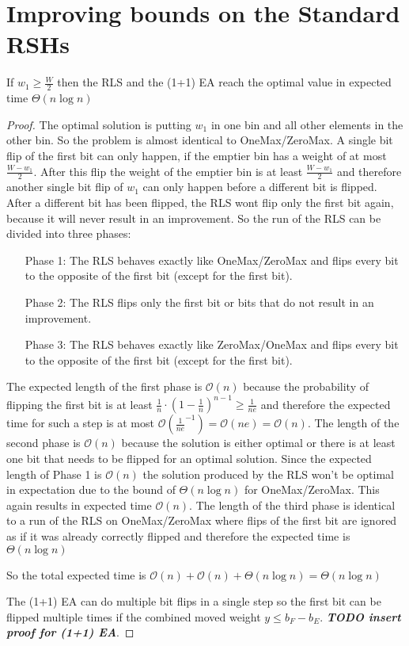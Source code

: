 \section{Improving bounds on the Standard RSHs}
\begin{lemma}\label{OneMaxResult}
    If $w_1 \ge \frac W 2$  then the RLS and the (1+1) EA reach the optimal value in expected time $\Theta(n\log{}n)$
\end{lemma}
\begin{proof}
    The optimal solution is putting $w_1$ in one bin and all other elements in the other bin. So the problem is almost identical to OneMax/ZeroMax. A single bit flip of the first bit can only happen, if the emptier bin has a weight of at most $\frac {W-w_1}{2}$. After this flip the weight of the emptier bin is at least $\frac {W-w_1}{2}$ and therefore another single bit flip of $w_1$ can only happen before a different bit is flipped. After a different bit has been flipped, the RLS wont flip only the first bit again, because it will never result in an improvement. So the run of the RLS can be divided into three phases:
    \begin{itemize}
        \item[Phase 1:] The RLS behaves exactly like OneMax/ZeroMax and flips every bit to the opposite of the first bit (except for the first bit).
        \item[Phase 2:] The RLS flips only the first bit or bits that do not result in an improvement.
        \item[Phase 3:] The RLS behaves exactly like ZeroMax/OneMax and flips every bit to the opposite of the first bit (except for the first bit).
    \end{itemize}

    The expected length of the first phase is $\mathcal{O}(n)$ because the probability of flipping the first bit is at least ${\frac{1}{n}} \cdot {(1 - \frac{1}{n})}^{n-1} \ge \frac{1}{ne}$ and therefore the expected time for such a step is at most $\mathcal{O}(\frac{1}{ne}^{-1}) = \mathcal{O}(ne) = \mathcal{O}(n)$.\newline
    The length of the second phase is $\mathcal{O}(n)$ because the solution is either optimal or there is at least one bit that needs to be flipped for an optimal solution. Since the expected length of Phase 1 is $\mathcal{O}(n)$ the solution produced by the RLS won't be optimal in expectation due to the bound of $\Theta(n\log{}n)$ for OneMax/ZeroMax. This again results in expected time $\mathcal{O}(n)$.\newline
    The length of the third phase is identical to a run of the RLS on OneMax/ZeroMax where flips of the first bit are ignored as if it was already correctly flipped and therefore the expected time is $\Theta(n\log{}n)$

    So the total expected time is $\mathcal{O}(n) + \mathcal{O}(n) + \Theta(n\log{}n) = \Theta(n\log{}n)$

    The (1+1) EA can do multiple bit flips in a single step so the first bit can be flipped multiple times if the combined moved weight \(y \le b_F-b_E\). \textbf{\textit{TODO\: insert proof for (1+1) EA}}.
\end{proof}

